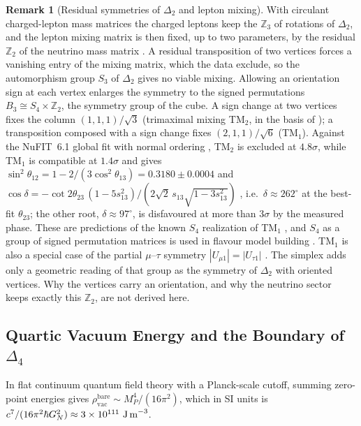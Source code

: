 \documentclass[11pt,a4paper,reqno]{amsart}
\theoremstyle{definition}
\newtheorem{remark}[theorem]{Remark}
\numberwithin{equation}{section}
\begin{document}
\begin{remark}[Residual symmetries of $\Delta_2$ and lepton mixing]
\label{rem:tm1_mixing}
With circulant charged-lepton mass matrices the charged leptons keep the $\mathbb{Z}_3$ of rotations of $\Delta_2$, and the lepton mixing matrix is then fixed, up to two parameters, by the residual $\mathbb{Z}_2$ of the neutrino mass matrix \cite{lam2008unique}. A residual transposition of two vertices forces a vanishing entry of the mixing matrix, which the data exclude, so the automorphism group $S_3$ of $\Delta_2$ gives no viable mixing. Allowing an orientation sign at each vertex enlarges the symmetry to the signed permutations $B_3 \cong S_4 \times \mathbb{Z}_2$, the symmetry group of the cube. A sign change at two vertices fixes the column $(1,1,1)/\sqrt3$ (trimaximal mixing TM$_2$, in the basis of \cite{ma2001softly}); a transposition composed with a sign change fixes $(2,1,1)/\sqrt6$ (TM$_1$). Against the NuFIT~6.1 global fit with normal ordering \cite{nufit61}, TM$_2$ is excluded at $4.8\sigma$, while TM$_1$ is compatible at $1.4\sigma$ and gives $\sin^2\theta_{12} = 1 - 2/(3\cos^2\theta_{13}) = 0.3180 \pm 0.0004$ and $\cos\delta = -\cot 2\theta_{23}\,(1 - 5s_{13}^2)/(2\sqrt2\, s_{13}\sqrt{1 - 3s_{13}^2})$ \cite{albright2009,albright2010}, i.e.\ $\delta \approx 262^\circ$ at the best-fit $\theta_{23}$; the other root, $\delta \approx 97^\circ$, is disfavoured at more than $3\sigma$ by the measured phase. These are predictions of the known $S_4$ realization of TM$_1$ \cite{king2013,varzielas2013,luhn2013}, and $S_4$ as a group of signed permutation matrices is used in flavour model building \cite{hagedorn2006}. TM$_1$ is also a special case of the partial $\mu$--$\tau$ symmetry $|U_{\mu1}| = |U_{\tau1}|$ \cite{xing2014partial}. The simplex adds only a geometric reading of that group as the symmetry of $\Delta_2$ with oriented vertices. Why the vertices carry an orientation, and why the neutrino sector keeps exactly this $\mathbb{Z}_2$, are not derived here.
\end{remark}

\subsection{Quartic Vacuum Energy and the Boundary of \texorpdfstring{$\Delta_4$}{Delta4}}
In flat continuum quantum field theory with a Planck-scale cutoff, summing zero-point energies gives $\rho_{\mathrm{vac}}^{\mathrm{bare}} \sim M_P^4 / (16\pi^2)$, which in SI units is $c^7/(16\pi^2\hbar G_N^2) \approx 3 \times 10^{111}\text{ J\,m}^{-3}$.
\end{document}
